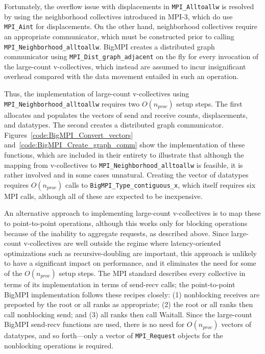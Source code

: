 Fortunately, the overflow issue with displacements in \texttt{MPI\_Alltoallw} is
resolved by using the neighborhood collectives introduced in MPI-3, which do
use \texttt{MPI\_Aint} for displacements.
On the other hand, neighborhood collectives require an appropriate
communicator, which must be constructed prior to calling \texttt{MPI\_Neighborhood\_alltoallw}.
BigMPI creates a distributed graph communicator using \texttt{MPI\_Dist\_graph\_adjacent}
on the fly for every invocation of the large-count v-collectives, which instead are assumed to incur
insignificant overhead compared with the data movement entailed in such an operation.

Thus, the implementation of large-count v-collectives using \texttt{MPI\_Neighborhood\_alltoallw} 
requires two $O(n_{proc})$ setup steps. The first allocates and populates the vectors of 
send and receive counts, displacements, and datatypes. 
The second creates a distributed graph communicator.
Figures~\ref{code:BigMPI_Convert_vectors} and~\ref{code:BigMPI_Create_graph_comm}
show the implementation of these functions, which are included in their entirety to illustrate that
although the mapping from v-collectives to \texttt{MPI\_Neighborhood\_alltoallw} is feasible,
it is rather involved and in some cases unnatural.
Creating the vector of datatypes requires $O(n_{proc})$ calls to \texttt{BigMPI\_Type\_contiguous\_x},
which itself requires six MPI calls, although all of these are expected to be inexpensive.


An alternative approach to implementing large-count v-collectives is to map
these to point-to-point operations, although this works only for blocking operations
because of the inability to aggregate requests, as described above.
Since large-count v-collectives are well outside the regime where latency-oriented 
optimizations such as recursive-doubling are important, this approach is unlikely to have a significant impact 
on performance, and it eliminates the need for some of the $O(n_{proc})$ setup steps.
The MPI standard describes every collective in terms of its implementation 
in terms of send-recv calls; the point-to-point BigMPI implementation 
follows these recipes closely:
(1) nonblocking receives are preposted by the root or all ranks as appropriate;
(2) the root or all ranks then call nonblocking send; 
and (3) all ranks then call Waitall.
Since the large-count BigMPI send-recv functions are used, there is no need for
$O(n_{proc})$ vectors of datatypes, and so forth---only a vector of \texttt{MPI\_Request}
objects for the nonblocking operations is required.

